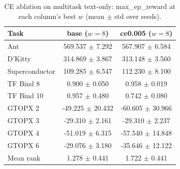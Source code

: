 \begin{table}[t]
\caption{CE ablation on multitask text-only: max\_ep\_reward at each column's best $w$ (mean $\pm$ std over seeds).}
\label{tab:ce-ablation}
\centering
\small
\begin{tabular}{lcc}
\toprule
Task & base ($w=8$) & ce0.005 ($w=8$) \\
\midrule
Ant & 569.537 $\pm$ 7.292 & 567.907 $\pm$ 6.584 \\
D'Kitty & 314.869 $\pm$ 3.867 & 313.148 $\pm$ 3.560 \\
Superconductor & 109.285 $\pm$ 6.547 & 112.230 $\pm$ 8.100 \\
TF Bind 8 & 0.900 $\pm$ 0.050 & 0.958 $\pm$ 0.019 \\
TF Bind 10 & 0.957 $\pm$ 0.480 & 0.742 $\pm$ 0.080 \\
GTOPX 2 & -49.225 $\pm$ 20.432 & -60.605 $\pm$ 30.966 \\
GTOPX 3 & -29.310 $\pm$ 2.161 & -29.310 $\pm$ 2.237 \\
GTOPX 4 & -51.019 $\pm$ 6.315 & -57.540 $\pm$ 14.848 \\
GTOPX 6 & -29.076 $\pm$ 3.180 & -35.646 $\pm$ 12.122 \\
\midrule
Mean rank & 1.278 $\pm$ 0.441 & 1.722 $\pm$ 0.441 \\
\bottomrule
\end{tabular}
\end{table}
